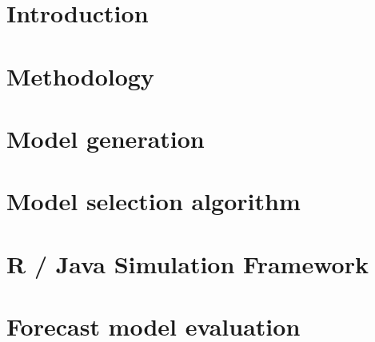 
\section{Introduction}


\section{Methodology}



\section{Model generation}


\section{Model selection algorithm}



\section{R / Java Simulation Framework}



\section{Forecast model evaluation}





